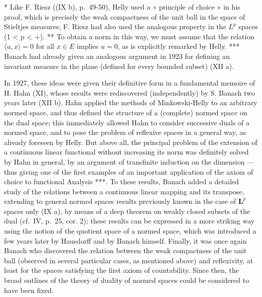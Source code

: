 * Like F. Riesz ((IX b), p.~49-50), Helly used a « principle of choice » in his proof, which is precisely the weak compactness of the unit ball in the space of Stieltjes measures; F. Riesz had also used the analogous property in the \(L^p\) spaces (1 < p < +\infty).
** To obtain a norm in this way, we must assume that the relation \(\langle u,x\rangle = 0\) for all \(x \in E\) implies \(u=0\), as is explicitly remarked by Helly.
*** Banach had already given an analogous argument in 1923 for defining an invariant measure in the plane (defined for every bounded subset) (XII a).

In 1927, these ideas were given their definitive form in a fundamental memoire of H. Hahn (XI), whose results were rediscovered (independently) by S. Banach two years later (XII b). Hahn applied the methods of Minkowski-Helly to an arbitrary normed space, and thus defined the structure of a (complete) normed space on the dual space; this immediately allowed Hahn to consider successive duals of a normed space, and to pose the problem of reflexive spaces in a general way, as already foreseen by Helly. But above all, the principal problem of the extension of a continuous linear functional without increasing its norm was definitely solved by Hahn in general, by an argument of transfinite induction on the dimension --- thus giving one of the first examples of an important application of the axiom of choice to functional Analysis ***. To these results, Banach added a detailed study of the relations between a continuous linear mapping and its transpose, extending to general normed spaces results previously known in the case of \(\mathbf{L}^p\) spaces only (IX a), by means of a deep theorem on weakly closed subsets of the dual (cf.~IV, p.~25, cor. 2); these results can be expressed in a more striking way using the notion of the quotient space of a normed space, which was introduced a few years later by Hausdorff and by Banach himself. Finally, it was once again Banach who discovered the relation between the weak compactness of the unit ball (observed in several particular cases, as mentioned above) and reflexivity, at least for the spaces satisfying the first axiom of countability. Since then, the broad outlines of the theory of duality of normed spaces could be considered to have been fixed.

